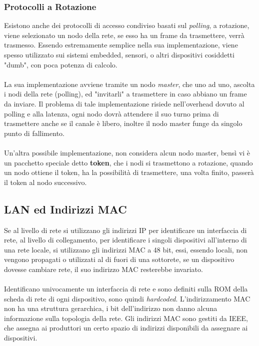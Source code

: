\documentclass[12pt, letterpaper]{article}
\newcommand{\acc}{\\\hphantom{}\\}
\begin{document}
\subsubsection{Protocolli a Rotazione}
Esistono anche dei protocolli di accesso condiviso basati sul \textit{polling}, a rotazione, viene selezionato 
un nodo della rete, se esso ha un frame da trasmettere, verrà trasmesso. Essendo estremamente semplice nella sua 
implementazione, viene spesso utilizzato sui sistemi embedded, sensori, o altri dispositivi cosiddetti "dumb", con 
poca potenza di calcolo.\acc 
La sua implementazione avviene tramite un nodo \textit{master}, che uno ad uno, ascolta i nodi della rete (polling), 
ed "invitarli" a trasmettere in caso abbiano un frame da inviare. Il problema di tale implementazione 
risiede nell'overhead dovuto al polling e alla latenza, ogni nodo dovrà attendere il suo turno prima di trasmettere 
anche se il canale è libero, inoltre il nodo master funge da singolo punto di fallimento.\acc 
Un'altra possibile implementazione, non considera alcun nodo master, bensì vi è un pacchetto speciale 
detto \textbf{token}, che i nodi si trasmettono a rotazione, quando un nodo ottiene il token, ha la possibilità 
di trasmettere, una volta finito, passerà il token al nodo successivo.
\subsection{LAN ed Indirizzi MAC}
Se al livello di rete si utilizzano gli indirizzi IP per identificare un interfaccia di rete, al livello di collegamento, 
per identificare i singoli dispositivi all'interno di una rete locale, si utilizzano gli indirizzi MAC a 48 bit, essi, 
essendo locali, non vengono propagati o utilizzati al di fuori di una sottorete, se un dispositivo dovesse cambiare 
rete, il suo indirizzo MAC resterebbe invariato.\acc 
Identificano univocamente un interfaccia di rete e sono definiti sulla ROM della scheda di rete di ogni dispositivo, sono 
quindi \textit{hardcoded}. L'indirizzamento MAC non ha una struttura gerarchica, i bit dell'indirizzo non 
danno alcuna informazione sulla topologia della rete. Gli indirizzi MAC sono gestiti da IEEE, che assegna ai produttori 
un certo spazio di indirizzi disponibili da assegnare ai dispositivi.
\end{document}
